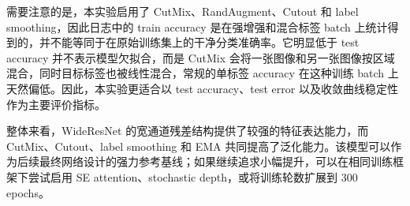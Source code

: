\documentclass[UTF8]{ctexart}
\begin{document}
需要注意的是，本实验启用了 CutMix、RandAugment、Cutout 和 label smoothing，因此日志中的 train accuracy 是在强增强和混合标签 batch 上统计得到的，并不能等同于在原始训练集上的干净分类准确率。它明显低于 test accuracy 并不表示模型欠拟合，而是 CutMix 会将一张图像和另一张图像按区域混合，同时目标标签也被线性混合，常规的单标签 accuracy 在这种训练 batch 上天然偏低。因此，本实验更适合以 test accuracy、test error 以及收敛曲线稳定性作为主要评价指标。

整体来看，WideResNet 的宽通道残差结构提供了较强的特征表达能力，而 CutMix、Cutout、label smoothing 和 EMA 共同提高了泛化能力。该模型可以作为后续最终网络设计的强力参考基线；如果继续追求小幅提升，可以在相同训练框架下尝试启用 SE attention、stochastic depth，或将训练轮数扩展到 300 epochs。
\end{document}

